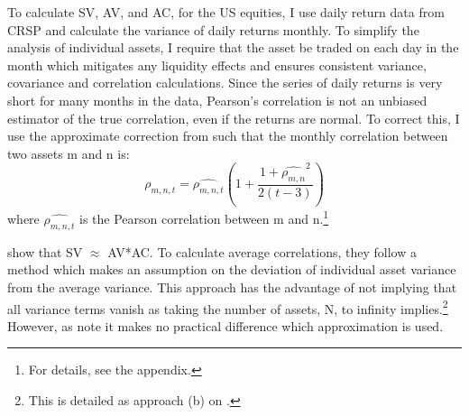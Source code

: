 To calculate SV, AV, and AC, for the US equities, I use daily return data from CRSP and calculate the variance of daily returns monthly. To simplify the analysis of individual assets, I require that the asset be traded on each day in the month which mitigates any liquidity effects and ensures consistent variance, covariance and correlation calculations. Since the series of daily returns is very short for many months in the data, Pearson’s correlation is not an unbiased estimator of the true correlation, even if the returns are normal. \citep{hotelling_1953} To correct this, I use the approximate correction from \cite{olkin_1958} such that the monthly correlation between two assets m and n is:
\begin{equation}
\rho_{m,n,t} = \widehat{\rho_{m,n,t}}\left(1 + \frac{1+\widehat{\rho_{m,n}}^{2}}{2(t-3)}\right)
\end{equation}
where $\widehat{\rho_{m,n,t}}$ is the Pearson correlation between m and n.\footnote{For details, see the appendix.}

\citet{pollet_average_2010} show that SV $\approx$ AV*AC. To calculate average correlations, they follow a method which makes an assumption on the deviation of individual asset variance from the average variance. This approach has the advantage of not implying that all variance terms vanish as taking the number of assets, N, to infinity implies.\footnote{This is detailed as approach (b) on \citet{nematrian}.} However, as \citet{tierens_anadu} note it makes no practical difference which approximation is used.

